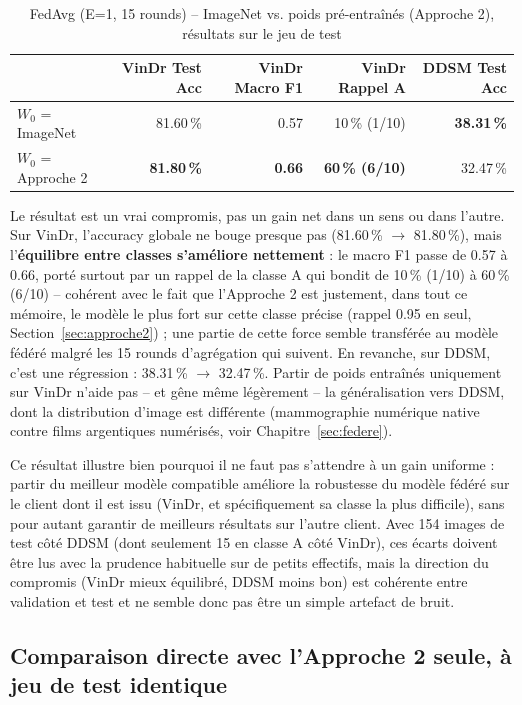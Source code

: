\documentclass[12pt,a4paper]{report}
\begin{document}
\begin{table}[h]
\centering
\caption{FedAvg (E=1, 15 rounds) -- ImageNet vs. poids pré-entraînés
(Approche 2), résultats sur le jeu de test}
\label{tab:federated_pretrained}
\begin{tabular}{lrrrr}
\toprule
 & VinDr Test Acc & VinDr Macro F1 & VinDr Rappel A & DDSM Test Acc \\
\midrule
$W_0$ = ImageNet & 81.60\,\% & 0.57 & 10\,\% (1/10) & \textbf{38.31\,\%} \\
$W_0$ = Approche 2 & \textbf{81.80\,\%} & \textbf{0.66} & \textbf{60\,\% (6/10)} & 32.47\,\% \\
\bottomrule
\end{tabular}
\end{table}

Le résultat est un vrai compromis, pas un gain net dans un sens ou dans
l'autre. Sur VinDr, l'accuracy globale ne bouge presque pas (81.60\,\%
$\to$ 81.80\,\%), mais l'\textbf{équilibre entre classes s'améliore
nettement} : le macro F1 passe de 0.57 à 0.66, porté surtout par un rappel
de la classe A qui bondit de 10\,\% (1/10) à 60\,\% (6/10) -- cohérent avec
le fait que l'Approche 2 est justement, dans tout ce mémoire, le modèle le
plus fort sur cette classe précise (rappel 0.95 en seul,
Section~\ref{sec:approche2}) ; une partie de cette force semble transférée
au modèle fédéré malgré les 15 rounds d'agrégation qui suivent. En
revanche, sur DDSM, c'est une régression : 38.31\,\% $\to$ 32.47\,\%. Partir
de poids entraînés uniquement sur VinDr n'aide pas -- et gêne même
légèrement -- la généralisation vers DDSM, dont la distribution d'image
est différente (mammographie numérique native contre films argentiques
numérisés, voir Chapitre~\ref{sec:federe}).

Ce résultat illustre bien pourquoi il ne faut pas s'attendre à un gain
uniforme : partir du \og{}meilleur\fg{} modèle compatible améliore la
robustesse du modèle fédéré sur le client dont il est issu (VinDr, et
spécifiquement sa classe la plus difficile), sans pour autant garantir de
meilleurs résultats sur l'autre client. Avec 154 images de test côté DDSM
(dont seulement 15 en classe A côté VinDr), ces écarts doivent être lus
avec la prudence habituelle sur de petits effectifs, mais la direction du
compromis (VinDr mieux équilibré, DDSM moins bon) est cohérente entre
validation et test et ne semble donc pas être un simple artefact de bruit.

\subsection{Comparaison directe avec l'Approche 2 seule, à jeu de test identique}
\end{document}
